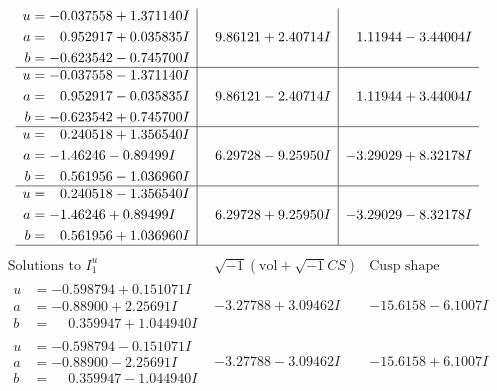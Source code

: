 \documentclass[1p]{elsarticle_modified}
\theoremstyle{definition}
\newcommand{\I}{\sqrt{-1}}
\begin{document}
$$\begin{array}{c|c|c}
\begin{aligned}
u &= -0.037558 + 1.371140 I \\
a &= \phantom{-}0.952917 + 0.035835 I \\
b &= -0.623542 - 0.745700 I\end{aligned}
 & \phantom{-}9.86121 + 2.40714 I & \phantom{-}1.11944 - 3.44004 I \\ \hline\begin{aligned}
u &= -0.037558 - 1.371140 I \\
a &= \phantom{-}0.952917 - 0.035835 I \\
b &= -0.623542 + 0.745700 I\end{aligned}
 & \phantom{-}9.86121 - 2.40714 I & \phantom{-}1.11944 + 3.44004 I \\ \hline\begin{aligned}
u &= \phantom{-}0.240518 + 1.356540 I \\
a &= -1.46246 - 0.89499 I \\
b &= \phantom{-}0.561956 - 1.036960 I\end{aligned}
 & \phantom{-}6.29728 - 9.25950 I & -3.29029 + 8.32178 I \\ \hline\begin{aligned}
u &= \phantom{-}0.240518 - 1.356540 I \\
a &= -1.46246 + 0.89499 I \\
b &= \phantom{-}0.561956 + 1.036960 I\end{aligned}
 & \phantom{-}6.29728 + 9.25950 I & -3.29029 - 8.32178 I\\
 \hline 
 \end{array}$$\newpage$$\begin{array}{c|c|c}  
\text{Solutions to }I^u_{1}& \I (\text{vol} + \sqrt{-1}CS) & \text{Cusp shape}\\
 \hline 
\begin{aligned}
u &= -0.598794 + 0.151071 I \\
a &= -0.88900 + 2.25691 I \\
b &= \phantom{-}0.359947 + 1.044940 I\end{aligned}
 & -3.27788 + 3.09462 I & -15.6158 - 6.1007 I \\ \hline\begin{aligned}
u &= -0.598794 - 0.151071 I \\
a &= -0.88900 - 2.25691 I \\
b &= \phantom{-}0.359947 - 1.044940 I\end{aligned}
 & -3.27788 - 3.09462 I & -15.6158 + 6.1007 I \\ \hline\begin{aligned}

\end{aligned}
\end{array}$$
\end{document}
